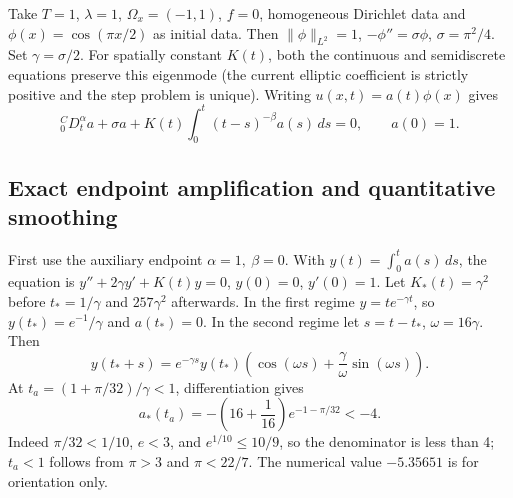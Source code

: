 \documentclass[11pt,a4paper]{amsart}
\theoremstyle{remark}
\theoremstyle{plain}
\theoremstyle{remark}
\numberwithin{equation}{section}
\begin{document}
Take $T=1$, $\lambda=1$, $\Omega_x=(-1,1)$, $f=0$, homogeneous Dirichlet data and $\phi(x)=\cos(\pi x/2)$ as initial data. Then $\|\phi\|_{L^2}=1$, $-\phi''=\sigma\phi$, $\sigma=\pi^2/4$. Set $\gamma=\sigma/2$. For spatially constant $K(t)$, both the continuous and semidiscrete equations preserve this eigenmode (the current elliptic coefficient is strictly positive and the step problem is unique). Writing $u(x,t)=a(t)\phi(x)$ gives
\begin{equation}\label{eq:st05-scalar}
 {}_0^CD_t^\alpha a+\sigma a+K(t)\int_0^t(t-s)^{-\beta}a(s)\,ds=0,\qquad a(0)=1.
\end{equation}

\subsection{Exact endpoint amplification and quantitative smoothing}
First use the auxiliary endpoint $\alpha=1,\ \beta=0$. With $y(t)=\int_0^t a(s)\,ds$, the equation is $y''+2\gamma y'+K(t)y=0$, $y(0)=0$, $y'(0)=1$. Let $K_*(t)=\gamma^2$ before $t_*=1/\gamma$ and $257\gamma^2$ afterwards. In the first regime $y=te^{-\gamma t}$, so $y(t_*)=e^{-1}/\gamma$ and $a(t_*)=0$. In the second regime let $s=t-t_*$, $\omega=16\gamma$. Then
\[
 y(t_*+s)=e^{-\gamma s}y(t_*)\left(\cos(\omega s)+\frac{\gamma}{\omega}\sin(\omega s)\right).
\]
At $t_a=(1+\pi/32)/\gamma<1$, differentiation gives
\begin{equation}\label{eq:st05-endpoint}
 a_*(t_a)=-\left(16+\frac1{16}\right)e^{-1-\pi/32}<-4.
\end{equation}
Indeed $\pi/32<1/10$, $e<3$, and $e^{1/10}\le 10/9$, so the denominator is less than 4; $t_a<1$ follows from $\pi>3$ and $\pi<22/7$. The numerical value $-5.35651$ is for orientation only.
\end{document}
